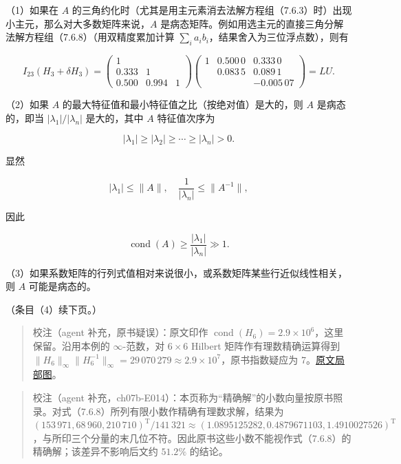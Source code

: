 \documentclass[
  10pt,
  fontset=fandol]{ctexart}
\begin{document}
（1）如果在 \(A\)
的三角约化时（尤其是用主元素消去法解方程组（7.6.3）时）出现小主元，那么对大多数矩阵来说，\(A\)
是病态矩阵。例如用选主元的直接三角分解法解方程组（7.6.8）（用双精度累加计算
\(\sum_i a_ib_i\)，结果舍入为三位浮点数），则有

\[
I_{23}(H_3+\delta H_3)
=\begin{pmatrix}
1&&\\
0.333&1&\\
0.500&0.994&1
\end{pmatrix}
\begin{pmatrix}
1&0.500\,0&0.333\,0\\
&0.083\,5&0.089\,1\\
&&\boxed{-0.005\,07}
\end{pmatrix}
=LU.
\]

（2）如果 \(A\) 的最大特征值和最小特征值之比（按绝对值）是大的，则 \(A\)
是病态的，即当 \(|\lambda_1|/|\lambda_n|\) 是大的，其中 \(A\)
特征值次序为

\[
|\lambda_1|\geqslant|\lambda_2|\geqslant\cdots\geqslant|\lambda_n|>0.
\]

显然

\[
|\lambda_1|\leqslant\|A\|,\quad\frac1{|\lambda_n|}\leqslant\|A^{-1}\|,
\]

因此

\[
\operatorname{cond}(A)\geqslant\frac{|\lambda_1|}{|\lambda_n|}\gg1.
\]

（3）如果系数矩阵的行列式值相对来说很小，或系数矩阵某些行近似线性相关，则
\(A\) 可能是病态的。

（条目（4）续下页。）

\begin{quote}
校注（agent 补充，原书疑误）：原文印作
\(\operatorname{cond}(H_6)=2.9\times10^6\)，这里保留。沿用本例的
\(\infty\)-范数，对 \(6\times6\) Hilbert 矩阵作有理数精确运算得到
\(\|H_6\|_\infty\|H_6^{-1}\|_\infty=29\,070\,279\approx2.9\times10^7\)，原书指数疑应为
7。\href{/Users/xiangjunfeng/Desktop/数值计算专用/numerical-analysis/book/staging/ch07b/assets/208-h6-cond.png}{原文局部图}。
\end{quote}

\begin{quote}
校注（agent
补充，ch07b-E014）：本页称为``精确解''的小数向量按原书照录。对式（7.6.8）所列有限小数作精确有理数求解，结果为
\((153\,971,68\,960,210\,710)^{\mathrm T}/141\,321\approx(1.0895125282,0.4879671103,1.4910027526)^{\mathrm T}\)，与所印三个分量的末几位不符。因此原书这些小数不能视作式（7.6.8）的精确解；该差异不影响后文约
\(51.2\%\) 的结论。
\end{quote}
\end{document}

